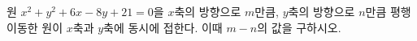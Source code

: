 원 $x^2+y^2+6x-8y+21=0$을 $x$축의 방향으로 $m$만큼, $y$축의 방향으로 $n$만큼 평행이동한 원이 $x$축과 $y$축에 동시에 접한다. 이때 $m-n$의 값을 구하시오. 
